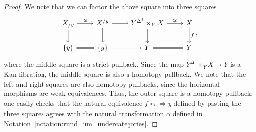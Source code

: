 \documentclass[main.tex]{subfiles}
\begin{document}
\begin{proof}
  We note that we can factor the above square into three squares
  \begin{equation*}
    \begin{tikzcd}
      X_{/y}
      \arrow[r, "\simeq"]
      \arrow[d]
      & X^{/y}
      \arrow[r]
      \arrow[d]
      & Y^{\Delta^{1}} \times_{Y} X
      \arrow[r, "\simeq"]
      \arrow[d]
      & X
      \arrow[d, "f"]
      \\
      \{y\}
      \arrow[r, equals]
      & \{y\}
      \arrow[r]
      & Y
      \arrow[r, equals]
      & Y
    \end{tikzcd},
  \end{equation*}
  where the middle square is a strict pullback. Since the map $Y^{\Delta^{1}} \times_{Y}X \to Y$ is a Kan fibration, the middle square is also a homotopy pullback. We note that the left and right squares are also homotopy pullbacks, since the horizontal morphisms are weak equivalences. Thus, the outer square is a homotopy pullback; one easily checks that the natural equivalence $f \circ \pi \Rightarrow \underline{y}$ defined by pasting the three squares agrees with the natural transformation $\alpha$ defined in \hyperref[notation:rund_um_undercategories]{Notation~\ref*{notation:rund_um_undercategories}}.
\end{proof}
\end{document}
